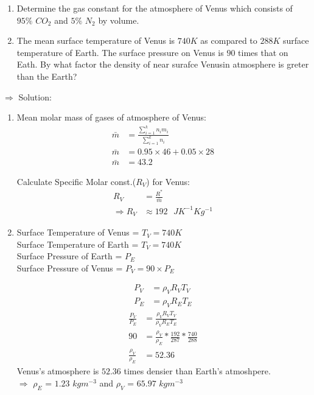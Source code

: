 \documentclass[fleqn,10pt]{SelfArx} %
\begin{document}
\begin{question}[label={q:4.1}]{
        \begin{enumerate}
            \item Determine the gas constant for the atmosphere of Venus which consists of $95\%$ $CO_2$ and $5\%$ $N_2$ by volume. 
            \item The mean surface temperature of Venus is $740K$ as compared to $288K$ surface temperature of Earth. The surface pressure on Venus is $90$ times that on Eath. By what factor the density of near surafce Venusin atmosphere is greter than the Earth? 
        \end{enumerate}
        }
        $\Rightarrow$ Solution:
        \begin{enumerate}
            \item Mean molar mass of gases of atmosphere of Venus:
                \begin{align*}
                    \bar{m} &= \frac{\sum^k_{i=1} n_im_i}{\sum^k_{i=1}n_i} \\
                    \bar{m} &= 0.95 \times 46 + 0.05\times28 \\
                    \bar{m} &= 43.2
                \end{align*}

                Calculate Specific Molar const.($R_V$) for Venus:
                \begin{align*}
                    R_V &= \frac{R^*}{\bar{m}}  \\
                    \Rightarrow R_V &\approx 192 \text{ $JK^{-1}Kg^{-1}$}
                \end{align*}
            \item Surface Temperature of Venus = $T_V = 740K$  \\
                  Surface Temperature of Earth = $T_V = 740K$  \\
                  Surface Pressure of Earth = $P_E$  \\
                  Surface Pressure of Venus = $P_V = 90 \times P_E$

                  \begin{align*}
                      P_V &= \rho_VR_VT_V \\
                      P_E &= \rho_VR_ET_E
                  \end{align*}
                  \begin{align*}
                      \frac{P_V}{P_E} &= \frac{\rho_V R_VT_V}{\rho_V R_ET_E} \\
                      90 &= \frac{\rho_V}{\rho_E} * \frac{192}{287} * \frac{740}{288} \\
                      \frac{\rho_V}{\rho_E} &= 52.36 
\end{align*}
Venus's atmosphere is $52.36$ times densier than Earth's atmoshpere. \\
$\Rightarrow$ $\rho_E$ = $1.23$ $kgm^{-3}$ and $\rho_V$ = $65.97$ $kgm^{-3}$
        \end{enumerate}
\end{question}
\end{document}
